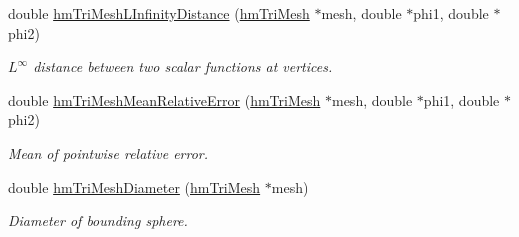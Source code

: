 \begin{DoxyCompactItemize}
double \hyperlink{structhm_tri_mesh_a697319de6c7f30be61b3f952043a836c}{hm\-Tri\-Mesh\-L\-Infinity\-Distance} (\hyperlink{structhm_tri_mesh}{hm\-Tri\-Mesh} $\ast$mesh, double $\ast$phi1, double $\ast$phi2)
\begin{DoxyCompactList}\small\item\em $L^\infty$ distance between two scalar functions at vertices. \end{DoxyCompactList}\item 
double \hyperlink{structhm_tri_mesh_abb7a03205d6d9767bb702e84048879f6}{hm\-Tri\-Mesh\-Mean\-Relative\-Error} (\hyperlink{structhm_tri_mesh}{hm\-Tri\-Mesh} $\ast$mesh, double $\ast$phi1, double $\ast$phi2)
\begin{DoxyCompactList}\small\item\em Mean of pointwise relative error. \end{DoxyCompactList}\item 
double \hyperlink{structhm_tri_mesh_aa469c6eece94b57ceada98c24b758819}{hm\-Tri\-Mesh\-Diameter} (\hyperlink{structhm_tri_mesh}{hm\-Tri\-Mesh} $\ast$mesh)
\begin{DoxyCompactList}\small\item\em Diameter of bounding sphere. \end{DoxyCompactList}\end{DoxyCompactItemize}
